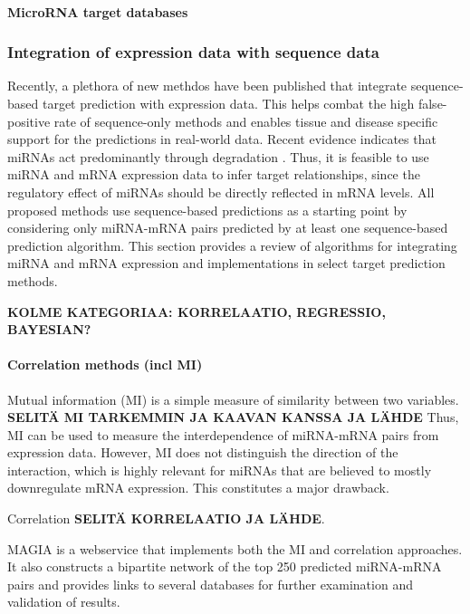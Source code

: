 \paragraph{MicroRNA target databases}





\subsubsection{Integration of expression data with sequence data}\label
{integration-of-expression-data-with-sequence-data}

Recently, a plethora of new methdos have been published that integrate
sequence-based target prediction with expression data. This helps combat the
high false-positive rate of sequence-only methods and enables tissue and
disease specific support for the predictions in real-world data. Recent
evidence indicates that miRNAs act predominantly through degradation
\citep{CITE}. Thus, it is feasible to use miRNA and mRNA expression data to
infer target relationships, since the regulatory effect of miRNAs should be
directly reflected in mRNA levels. All proposed methods use sequence-based
predictions as a starting point by considering only miRNA-mRNA pairs predicted
by at least one sequence-based prediction algorithm. This section provides a
review of algorithms for integrating miRNA and mRNA expression and
implementations in select target prediction methods.

\textbf{KOLME KATEGORIAA: KORRELAATIO, REGRESSIO, BAYESIAN?}



\paragraph{Correlation methods (incl MI)}\label{correlation-methods}

Mutual information (MI) is a simple measure of similarity between two
variables. \textbf{SELITÄ MI TARKEMMIN JA KAAVAN KANSSA JA LÄHDE} Thus, MI can
be used to measure the interdependence of miRNA-mRNA pairs from expression
data. However, MI does not distinguish the direction of the interaction, which
is highly relevant for miRNAs that are believed to mostly downregulate mRNA
expression. This constitutes a major drawback.

Correlation \textbf{SELITÄ KORRELAATIO JA LÄHDE}.

MAGIA \citep{Sales2010} is a webservice that implements both the MI and
correlation approaches. It also constructs a bipartite network of the top 250
predicted miRNA-mRNA pairs and provides links to several databases for further
examination and validation of results.

